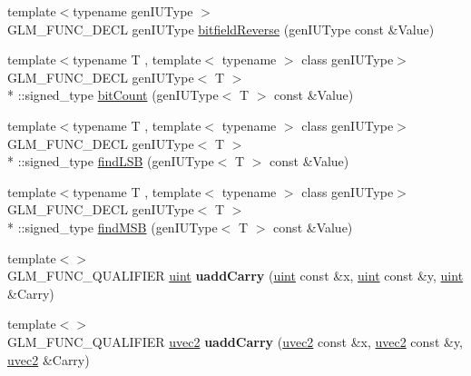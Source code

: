 \begin{DoxyCompactItemize}
\item 
{\footnotesize template$<$typename gen\-I\-U\-Type $>$ }\\G\-L\-M\-\_\-\-F\-U\-N\-C\-\_\-\-D\-E\-C\-L gen\-I\-U\-Type \hyperlink{group__core__func__integer_gac28880e609c6eeb0a28f1a54b1edc715}{bitfield\-Reverse} (gen\-I\-U\-Type const \&Value)
\item 
{\footnotesize template$<$typename T , template$<$ typename $>$ class gen\-I\-U\-Type$>$ }\\G\-L\-M\-\_\-\-F\-U\-N\-C\-\_\-\-D\-E\-C\-L gen\-I\-U\-Type$<$ T $>$\\*
\-::signed\-\_\-type \hyperlink{group__core__func__integer_gaf5ecf64cbcb7f806a3c7915dd622209b}{bit\-Count} (gen\-I\-U\-Type$<$ T $>$ const \&Value)
\item 
{\footnotesize template$<$typename T , template$<$ typename $>$ class gen\-I\-U\-Type$>$ }\\G\-L\-M\-\_\-\-F\-U\-N\-C\-\_\-\-D\-E\-C\-L gen\-I\-U\-Type$<$ T $>$\\*
\-::signed\-\_\-type \hyperlink{group__core__func__integer_ga43d5d9ec05ba4c46035c764ad5fd3135}{find\-L\-S\-B} (gen\-I\-U\-Type$<$ T $>$ const \&Value)
\item 
{\footnotesize template$<$typename T , template$<$ typename $>$ class gen\-I\-U\-Type$>$ }\\G\-L\-M\-\_\-\-F\-U\-N\-C\-\_\-\-D\-E\-C\-L gen\-I\-U\-Type$<$ T $>$\\*
\-::signed\-\_\-type \hyperlink{group__core__func__integer_gaee931af2eaecf61b629b33899c9d6f29}{find\-M\-S\-B} (gen\-I\-U\-Type$<$ T $>$ const \&Value)
\item 
\hypertarget{namespaceglm_a58f7d2bd0bc8d3af9e362e904fd20aa3}{{\footnotesize template$<$$>$ }\\G\-L\-M\-\_\-\-F\-U\-N\-C\-\_\-\-Q\-U\-A\-L\-I\-F\-I\-E\-R \hyperlink{group__core__precision_ga4fd29415871152bfb5abd588334147c8}{uint} {\bfseries uadd\-Carry} (\hyperlink{group__core__precision_ga4fd29415871152bfb5abd588334147c8}{uint} const \&x, \hyperlink{group__core__precision_ga4fd29415871152bfb5abd588334147c8}{uint} const \&y, \hyperlink{group__core__precision_ga4fd29415871152bfb5abd588334147c8}{uint} \&Carry)}\label{namespaceglm_a58f7d2bd0bc8d3af9e362e904fd20aa3}

\item 
\hypertarget{namespaceglm_a9dab4b979638deec548f2d2a3e1700a8}{{\footnotesize template$<$$>$ }\\G\-L\-M\-\_\-\-F\-U\-N\-C\-\_\-\-Q\-U\-A\-L\-I\-F\-I\-E\-R \hyperlink{group__core__types_gafd2041b45eff671aa8899d2c2835eee9}{uvec2} {\bfseries uadd\-Carry} (\hyperlink{group__core__types_gafd2041b45eff671aa8899d2c2835eee9}{uvec2} const \&x, \hyperlink{group__core__types_gafd2041b45eff671aa8899d2c2835eee9}{uvec2} const \&y, \hyperlink{group__core__types_gafd2041b45eff671aa8899d2c2835eee9}{uvec2} \&Carry)}\label{namespaceglm_a9dab4b979638deec548f2d2a3e1700a8}


\end{DoxyCompactItemize}
